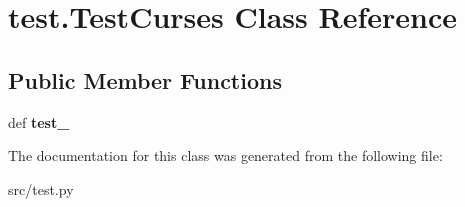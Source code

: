 \hypertarget{classtest_1_1_test_curses}{\section{test.\-Test\-Curses \-Class \-Reference}
\label{classtest_1_1_test_curses}
}
\subsection*{\-Public \-Member \-Functions}
\begin{DoxyCompactItemize}
\item 
\hypertarget{classtest_1_1_test_curses_a6da36996c09fd0d3154e942a7e0cd505}{def {\bfseries test\-\_\-}}\label{classtest_1_1_test_curses_a6da36996c09fd0d3154e942a7e0cd505}

\end{DoxyCompactItemize}


\-The documentation for this class was generated from the following file\-:\begin{DoxyCompactItemize}
\item 
src/test.\-py\end{DoxyCompactItemize}

